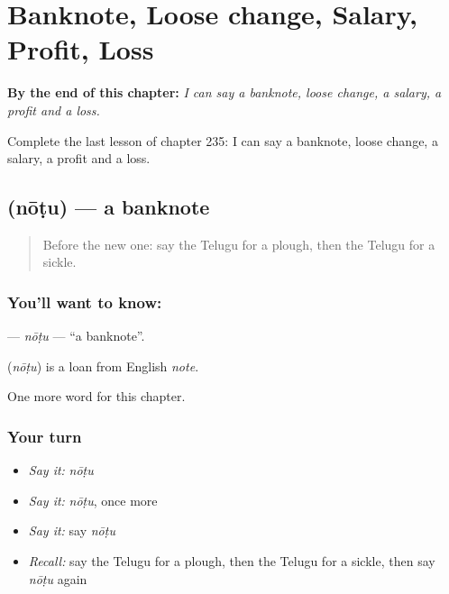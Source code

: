 
\chapter{Banknote, Loose change, Salary, Profit, Loss}
\label{ch:te-banknote-loose-change-salary-profit-loss}

\begin{chapteropening}
\textbf{By the end of this chapter:} \emph{I can say a banknote, loose change, a salary, a profit and a loss.}

Complete the last lesson of chapter 235: I can say a banknote, loose change, a salary, a profit and a loss.
\end{chapteropening}

\section[\texorpdfstring{\te{నోటు} (nōṭu)}{నోటు (nōṭu)}]{ (nōṭu) — a banknote}

\label{lesson:TE-C235-notu}



\begin{quote}
Before the new one: say the Telugu for a plough, then the Telugu for a sickle.
\end{quote}

\subsection*{You'll want to know: }
\textbf{} — \emph{nōṭu} — \textquotedblleft{}a banknote\textquotedblright{}.

\begin{cousinweb}
\textbf{} (\emph{nōṭu}) is a loan from English \emph{note}.
\end{cousinweb}

\begin{grammarlens}[title={What you've built}]
One more word for this chapter.
\end{grammarlens}

\subsection*{Your turn}
\begin{itemize}
\raggedright
  \item \emph{Say it:} \emph{nōṭu}
  \item \emph{Say it:} \emph{nōṭu}, once more
  \item \emph{Say it:} say \emph{nōṭu}
  \item \emph{Recall:} say the Telugu for a plough, then the Telugu for a sickle, then say \emph{nōṭu} again
\end{itemize}


